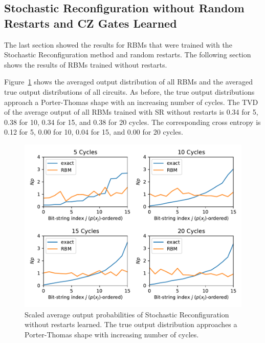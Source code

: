 \newpage

\subsection{Stochastic Reconfiguration without Random Restarts and CZ Gates Learned}

The last section showed the results for RBMs that were trained with the Stochastic Reconfiguration
method and random restarts. The following section shows the results of RBMs trained without restarts.

Figure~\ref{fig:sr_no_restarts_avgPDF} shows the averaged output distribution of all RBMs and
the averaged true output distributions of all circuits. As before, the 
true output distributions approach a Porter-Thomas shape with an increasing number of cycles.
The TVD of the average output of all RBMs trained with SR without restarts
is 0.34 for 5, 0.38 for 10, 0.34 for 15, and 0.38 for 20 cycles. The corresponding cross entropy is 
0.12 for 5, 0.00 for 10, 0.04 for 15, and 0.00 for 20 cycles.

\begin{figure}[H]
  \centering
  \includegraphics[width=\textwidth]{figures/results/SR-no-restarts-learned/avgPDF.pdf}
  \caption[Scaled average output probabilities of Stochastic Reconfiguration without restarts learned]{
    Scaled average output probabilities of Stochastic Reconfiguration without restarts learned. The true 
    output distribution approaches a Porter-Thomas shape with increasing number of cycles.}
  \label{fig:sr_no_restarts_avgPDF}
\end{figure}

